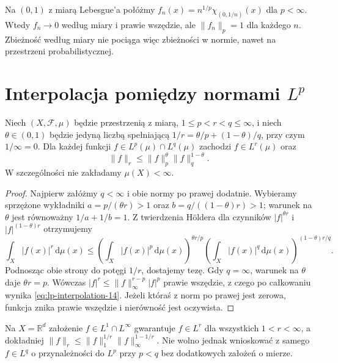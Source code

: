\begin{przyklad}
Na $(0,1)$ z miarą Lebesgue'a połóżmy
$f_n(x)=n^{1/p}\chi_{(0,1/n)}(x)$ dla $p<\infty$.
Wtedy $f_n\to0$ według miary i prawie wszędzie,
ale $\|f_n\|_p=1$ dla każdego $n$.
Zbieżność według miary nie pociąga więc zbieżności
w normie, nawet na przestrzeni probabilistycznej.
\end{przyklad}

\section{Interpolacja pomiędzy normami \texorpdfstring{$L^p$}{L\string^p}}

\begin{twierdzenie}
\label{thm:lp-interpolation-14}
Niech $(X,\mathcal F,\mu)$ będzie przestrzenią z miarą,
$1\le p<r<q\le\infty$, i niech $\theta\in(0,1)$
będzie jedyną liczbą spełniającą
$1/r=\theta/p+(1-\theta)/q$, przy czym $1/\infty=0$.
Dla każdej funkcji $f\in L^p(\mu)\cap L^q(\mu)$
zachodzi $f\in L^r(\mu)$ oraz
\begin{equation}\label{eq:lp-interpolation-14}
\|f\|_r\le\|f\|_p^{\theta}\|f\|_q^{1-\theta}.
\end{equation}
W szczególności nie zakładamy $\mu(X)<\infty$.
\end{twierdzenie}
\begin{proof}
Najpierw załóżmy $q<\infty$ i obie normy po prawej
dodatnie. Wybieramy sprzężone wykładniki
$a=p/(\theta r)>1$ oraz $b=q/((1-\theta)r)>1$;
warunek na $\theta$ jest równoważny $1/a+1/b=1$.
Z twierdzenia Höldera dla czynników
$|f|^{\theta r}$ i $|f|^{(1-\theta)r}$ otrzymujemy
\[
\int_X|f(x)|^r\,\mathrm d\mu(x)
\le\left(\int_X|f(x)|^p\,\mathrm d\mu(x)\right)^{\theta r/p}
\left(\int_X|f(x)|^q\,\mathrm d\mu(x)\right)^{(1-\theta)r/q}.
\]
Podnosząc obie strony do potęgi $1/r$, dostajemy tezę.
Gdy $q=\infty$, warunek na $\theta$ daje
$\theta r=p$. Wówczas
$|f|^r\le\|f\|_\infty^{r-p}|f|^p$
prawie wszędzie, z czego po całkowaniu wynika
\eqref{eq:lp-interpolation-14}. Jeżeli któraś
z norm po prawej jest zerowa, funkcja znika
prawie wszędzie i nierówność jest oczywista.
\end{proof}

\begin{przyklad}
Na $X=\mathbb R^d$ założenie $f\in L^1\cap L^\infty$
gwarantuje $f\in L^r$ dla wszystkich $1<r<\infty$,
a dokładniej $\|f\|_r\le\|f\|_1^{1/r}
\|f\|_\infty^{1-1/r}$. Nie wolno jednak wnioskować
z samego $f\in L^q$ o przynależności do $L^p$
przy $p<q$ bez dodatkowych założeń o mierze.
\end{przyklad}

